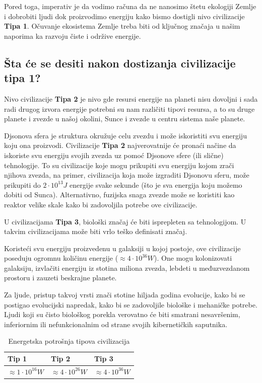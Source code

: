 \documentclass[a4paper]{article}
\begin{document}
Pored toga, imperativ je da vodimo računa da ne nanosimo štetu ekologiji Zemlje i dobrobiti ljudi dok proizvodimo energiju kako bismo dostigli nivo civilizacije \textbf{Tipa 1}. Očuvanje ekosistema Zemlje treba biti od ključnog značaja u našim naporima ka razvoju čiste i održive energije.


\subsection{Šta će se desiti nakon dostizanja civilizacije tipa 1?}
Nivo civilizacije \textbf{Tipa 2} je nivo gde resursi energije na planeti nisu dovoljni i sada radi drugog izvora energije potrebni su nam različiti tipovi resursa, a to su druge planete i zvezde u našoj okolini, Sunce i zvezde u centru sistema naše planete.

Djsonova sfera je struktura okružuje celu zvezdu i može iskoristiti svu energiju koju ona proizvodi. Civilizacije \textbf{Tipa 2} najverovatnije će pronaći načine da iskoriste svu energiju svojih zvezda uz pomoć Djsonove sfere (ili slične) tehnologije. To su civilizacije koje mogu prikupiti svu energiju kojom zrači njihova zvezda, na primer, civilizacija koja može izgraditi Djsonovu sferu, može prikupiti do $2 \cdot 10^{13}J$  energije svake sekunde (što je sva energija koju možemo dobiti od Sunca). Alternativno, fuzijska snaga zvezde može se koristiti kao reaktor velike skale kako bi zadovoljila potrebe ove civilizacije.

U civilizacijama \textbf{Tipa 3}, biološki značaj će biti isprepleten sa tehnologijom. U takvim civilizacijama može biti vrlo teško definisati značaj.

Koristeći svu energiju proizvedenu u galaksiji u kojoj postoje, ove civilizacije poseduju ogromnu količinu energije ($\approx 4 \cdot 10^{36} W$). One mogu kolonizovati galaksiju, izvlačiti energiju iz stotina miliona zvezda, lebdeti u međuzvezdanom prostoru i zauzeti beskrajne planete.

Za ljude, pristup takvoj vrsti znači stotine hiljada godina evolucije, kako bi se postigao evolucijski napredak, kako bi se zadovoljile biološke i mehaničke potrebe. Ljudi koji su čisto biološkog porekla verovatno će biti smatrani nesavršenim, inferiornim ili nefunkcionalnim od strane svojih kibernetičkih saputnika.

\renewcommand{\arraystretch}{1.5}
\begin{table}[]
    \centering
    \begin{tabular}{ |p{3cm}||p{3cm}|p{3cm}|  }
        \hline
        Tip 1& Tip 2 & Tip 3\\
        \hline
        $\approx 1 \cdot 10^{16} W$  & $\approx 4 \cdot 10^{26} W$ &$\approx 4 \cdot 10^{36} W$ \\
        \hline
    \end{tabular}
    \caption{Energetska potrošnja tipova civilizacija}
    \label{table:energetsa_potrosnja}
\end{table}
\end{document}
